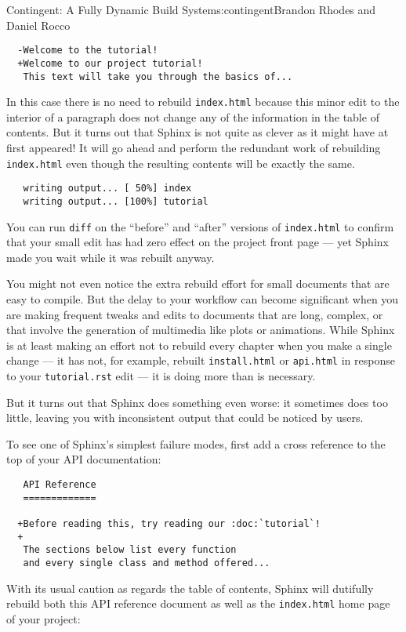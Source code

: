\begin{aosachapter}{Contingent: A Fully Dynamic Build System}{s:contingent}{Brandon Rhodes and Daniel Rocco}
\begin{verbatim}
  -Welcome to the tutorial!
  +Welcome to our project tutorial!
   This text will take you through the basics of...
\end{verbatim}

In this case there is no need to rebuild \texttt{index.html} because
this minor edit to the interior of a paragraph does not change any of
the information in the table of contents. But it turns out that Sphinx
is not quite as clever as it might have at first appeared! It will go
ahead and perform the redundant work of rebuilding \texttt{index.html}
even though the resulting contents will be exactly the same.

\begin{verbatim}
   writing output... [ 50%] index
   writing output... [100%] tutorial
\end{verbatim}

You can run \texttt{diff} on the ``before'' and ``after'' versions of
\texttt{index.html} to confirm that your small edit has had zero effect
on the project front page --- yet Sphinx made you wait while it was
rebuilt anyway.

You might not even notice the extra rebuild effort for small documents
that are easy to compile. But the delay to your workflow can become
significant when you are making frequent tweaks and edits to documents
that are long, complex, or that involve the generation of multimedia
like plots or animations. While Sphinx is at least making an effort not
to rebuild every chapter when you make a single change --- it has not,
for example, rebuilt \texttt{install.html} or \texttt{api.html} in
response to your \texttt{tutorial.rst} edit --- it is doing more than is
necessary.

But it turns out that Sphinx does something even worse: it sometimes
does too little, leaving you with inconsistent output that could be
noticed by users.

To see one of Sphinx's simplest failure modes, first add a cross
reference to the top of your API documentation:

\begin{verbatim}
   API Reference
   =============

  +Before reading this, try reading our :doc:`tutorial`!
  +
   The sections below list every function
   and every single class and method offered...
\end{verbatim}

With its usual caution as regards the table of contents, Sphinx will
dutifully rebuild both this API reference document as well as the
\texttt{index.html} home page of your project:


\end{aosachapter}
